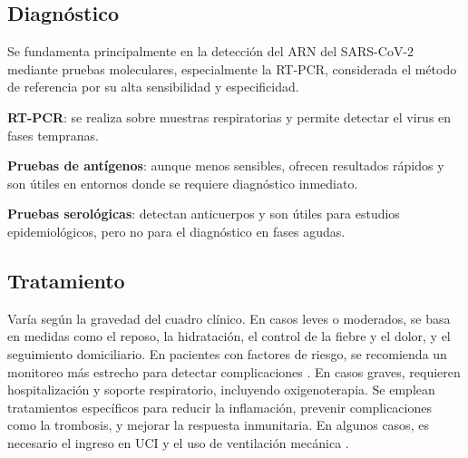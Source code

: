 \begin{enumerate}
\subsection{Diagnóstico}
Se fundamenta principalmente \cite{ko2022covid} en la detección del ARN del SARS-CoV-2 mediante pruebas moleculares, especialmente la RT-PCR, considerada el método de referencia por su alta sensibilidad y especificidad.

\textbf{RT-PCR}: se realiza sobre muestras respiratorias y permite detectar el virus en fases tempranas.

\textbf{Pruebas de antígenos}: aunque menos sensibles, ofrecen resultados rápidos y son útiles en entornos donde se requiere diagnóstico inmediato.

\textbf{Pruebas serológicas}: detectan anticuerpos y son útiles para estudios epidemiológicos, pero no para el diagnóstico en fases agudas.

\subsection{Tratamiento}
Varía según la gravedad del cuadro clínico. En casos leves o moderados, se basa en medidas como el reposo, la hidratación, el control de la fiebre y el dolor, y el seguimiento domiciliario. En pacientes con factores de riesgo, se recomienda un monitoreo más estrecho para detectar complicaciones \cite{qaseem2023outpatient}. En casos graves, requieren hospitalización y soporte respiratorio, incluyendo oxigenoterapia. Se emplean tratamientos específicos para reducir la inflamación, prevenir complicaciones como la trombosis, y mejorar la respuesta inmunitaria. En algunos casos, es necesario el ingreso en UCI y el uso de ventilación mecánica \cite{wiersinga2020pathophysiology}.


\end{enumerate}
